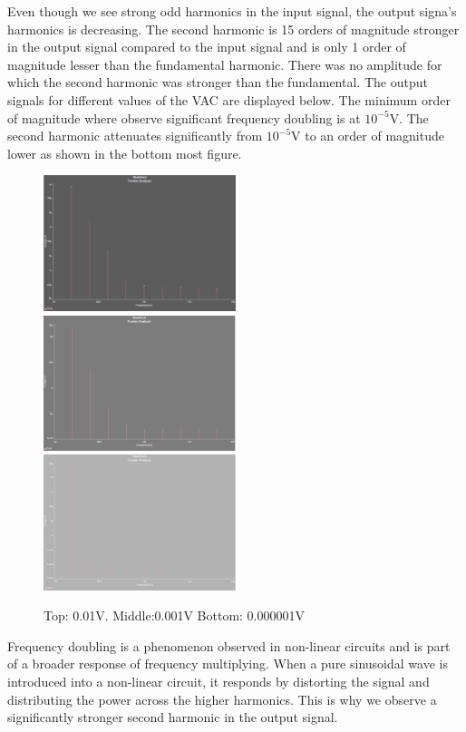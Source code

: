 \documentclass[authoryear, 12pt,5p, times]{elsarticle}
\begin{document}
\par Even though we see strong odd harmonics in the input signal, the output signa's harmonics is decreasing. The second harmonic is 15 orders of magnitude stronger in the output signal compared to the input signal and is only 1 order of magnitude lesser than the fundamental harmonic. There was no amplitude for which the second harmonic was stronger than the fundamental. The output signals for different values of the VAC are displayed below. The minimum order of magnitude where observe significant frequency doubling is at $10^{-5}$V. The second harmonic attenuates significantly from $10^{-5}$V to an order of magnitude lower as shown in the bottom most figure.
\begin{figure}
\center
\includegraphics[width=0.5\textwidth]{figure/0_01V}
\includegraphics[width=0.5\textwidth]{figure/0_001V}
\includegraphics[width=0.5\textwidth]{figure/0_000001V}
\caption{Top: 0.01V. Middle:0.001V Bottom: 0.000001V}
\label{fourier3}
\end{figure}
\par  Frequency doubling is a phenomenon observed in non-linear circuits and is part of a broader response of frequency multiplying. When a pure sinusoidal wave is introduced into a non-linear circuit, it responds by distorting the signal and distributing the power across the higher harmonics. This is why we observe a significantly stronger second harmonic in the output signal.
\end{document}
